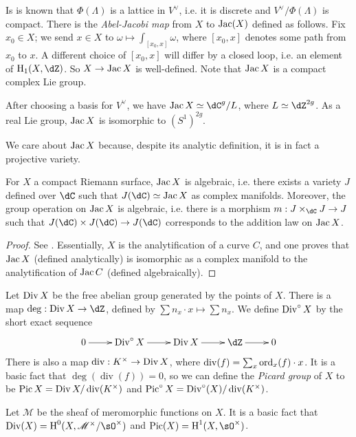 \documentclass{article}
\begin{document}
Is is known that $\Phi(\Lambda)$ is a lattice in $V^\vee$, i.e. it is discrete 
and $V^\vee/\Phi(\Lambda)$ is compact. There is the \emph{Abel-Jacobi map} from 
$X$ to $\operatorname{Jac}(X)$ defined as follows. Fix $x_0\in X$; we send $x\in X$ to 
$\omega\mapsto \int_{[x_0,x]} \omega$, where $[x_0,x]$ denotes some path from 
$x_0$ to $x$. A different choice of $[x_0,x]$ will differ by a closed loop, 
i.e. an element of $\h_1(X,\dZ)$. So $X\to\operatorname{Jac} X$ is well-defined. Note 
that $\operatorname{Jac} X$ is a compact complex Lie group. 

\begin{remark}
After choosing a basis for $V^\vee$, we have $\jac X\simeq \dC^g/L$, where 
$L\simeq \dZ^{2 g}$. As a real Lie group, $\operatorname{Jac} X$ is isomorphic to 
$(S^1)^{2 g}$. 
\end{remark}

We care about $\operatorname{Jac} X$ because, despite its analytic definition, it is in fact 
a projective variety.

\begin{theorem}
For $X$ a compact Riemann surface, $\operatorname{Jac} X$ is algebraic, i.e. there exists a 
variety $J$ defined over $\dC$ such that $J(\dC)\simeq\jac X$ as 
complex manifolds. Moreover, the group operation on $\operatorname{Jac} X$ is algebraic, 
i.e. there is a morphism $m:J\times_\dC J\to J$ such that 
$J(\dC)\times J(\dC)\to J(\dC)$ corresponds to the 
addition law on $\operatorname{Jac} X$. 
\end{theorem}
\begin{proof}
See \cite[I.18]{mi}. Essentially, $X$ is the analytification of a curve $C$, 
and one proves that $\operatorname{Jac} X$ (defined analytically) is isomorphic as a complex 
manifold to the analytification of $\operatorname{Jac} C$ (defined algebraically). 
\end{proof}

Let $\operatorname{Div} X$ be the free abelian group generated by the points of $X$. There 
is a map $\deg:\divisor X\to \dZ$, defined by 
$\sum n_x\cdot x\mapsto \sum n_x$. We define $\operatorname{Div}^\circ X$ by the short exact 
sequence 
\[\xymatrix{
  0 \ar[r]
    & \divisor^\circ X \ar[r]
    & \divisor X \ar[r]
    & \dZ \ar[r]
    & 0
}\]
There is also a map $\operatorname{div}:K^\times\to \operatorname{Div} X$, where 
$\operatorname{div}(f) = \sum_x \operatorname{ord}_x(f)\cdot x$. It is a basic fact that 
$\deg(\operatorname{div}(f)) = 0$, so we can define the \emph{Picard group} 
of $X$ to be $\operatorname{Pic} X = \operatorname{Div} X/\operatorname{div}(K^\times)$ and 
$\operatorname{Pic}^\circ X = \operatorname{Div}^\circ (X)/\operatorname{div}(K^\times)$. 

\begin{remark}
Let $\mathscr{M}$ be the sheaf of meromorphic functions on $X$. It is a basic 
fact that $\divisor(X)=\h^0(X,\mathscr{M}^\times/\sO^\times)$ and 
$\picard(X)=\h^1(X,\sO^\times)$. 
\end{remark}
\end{document}
